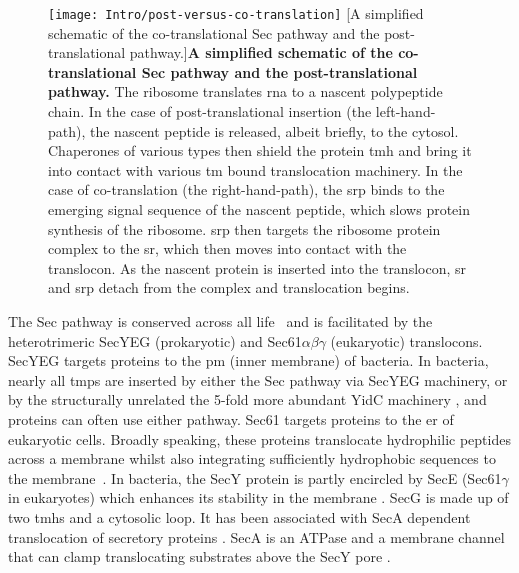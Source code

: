 \begin{figure}[ht]
\centering
\texttt{[image: Intro/post-versus-co-translation]}
		[A simplified schematic of the co\--translational Sec pathway and the post\--translational pathway.]{\textbf{A simplified schematic of the co\--translational Sec pathway and the post\--translational pathway.}
		The ribosome translates \gls{rna} to a nascent polypeptide chain.
		In the case of post\--translational insertion (the left\--hand\--path), the nascent peptide is released, albeit briefly, to the cytosol.
		Chaperones of various types then shield the protein \gls{tmh} and bring it into contact with various \gls{tm} bound translocation machinery.
		In the case of co\--translation (the right\--hand\--path), the \gls{srp} binds to the emerging signal sequence of the nascent peptide, which slows protein synthesis of the ribosome.
		\gls{srp} then targets the ribosome protein complex to the \gls{sr}, which then moves into contact with the translocon.
		As the nascent protein is inserted into the translocon, \gls{sr} and \gls{srp} detach from the complex and translocation begins.
		}
\label{fig:post-versus-co-translation}
\end{figure}

The Sec pathway is conserved across all life~\cite{Cao2003} and is facilitated by the heterotrimeric SecYEG (prokaryotic) and Sec61$\alpha\beta\gamma$ (eukaryotic) translocons.
SecYEG targets proteins to the \gls{pm} (inner membrane) of bacteria.
In bacteria, nearly all \gls{tmp}s are inserted by either the Sec pathway via  SecYEG machinery, or by the structurally unrelated the 5\--fold more abundant YidC machinery \cite{Drew2003, Dalbey2014}, and proteins can often use either pathway.
Sec61 targets proteins to the \gls{er} of eukaryotic cells.
Broadly speaking, these proteins translocate hydrophilic peptides across a membrane whilst also integrating sufficiently hydrophobic sequences to the membrane~\cite{Junne2010, Park2012, Shao2011, Cymer2015}.
In bacteria, the SecY protein is partly encircled by SecE (Sec61$\gamma$ in eukaryotes) which enhances its stability in the membrane \cite{Kihara1995}.
SecG is made up of two \gls{tmh}s and a cytosolic loop.
It has been associated with SecA dependent translocation of secretory proteins \cite{Duong1997, Koch2000}.
SecA is an ATPase and a membrane channel that can clamp translocating substrates above the SecY pore \cite{Zimmer2008}.

